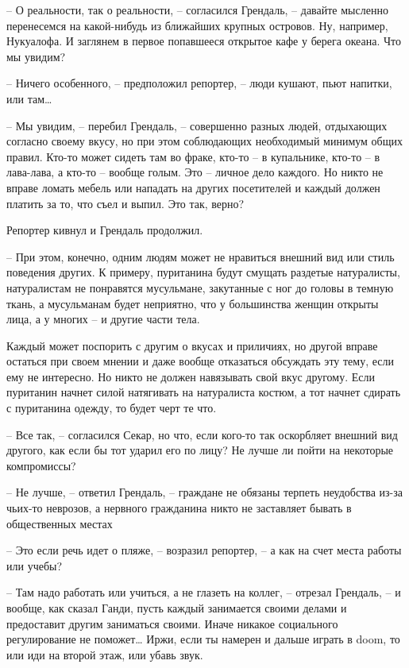 -- О реальности, так о реальности, -- согласился Грендаль, -- давайте мысленно перенесемся на какой-нибудь из ближайших крупных островов. Ну, например, Нукуалофа. И заглянем в первое попавшееся открытое кафе у берега океана. Что мы увидим?

-- Ничего особенного, -- предположил репортер, -- люди кушают, пьют напитки, или там\ldots{}

-- Мы увидим, -- перебил Грендаль, -- совершенно разных людей, отдыхающих согласно своему вкусу, но при этом соблюдающих необходимый минимум общих правил. Кто-то может сидеть там во фраке, кто-то -- в купальнике, кто-то -- в лава-лава, а кто-то -- вообще голым. Это -- личное дело каждого. Но никто не вправе ломать мебель или нападать на других посетителей и каждый должен платить за то, что съел и выпил. Это так, верно?

Репортер кивнул и Грендаль продолжил.

-- При этом, конечно, одним людям может не нравиться внешний вид или стиль поведения других. К примеру, пуританина будут смущать раздетые натуралисты, натуралистам не понравятся мусульмане, закутанные с ног до головы в темную ткань, а мусульманам будет неприятно, что у большинства женщин открыты лица, а у многих -- и другие части тела.

Каждый может поспорить с другим о вкусах и приличиях, но другой вправе остаться при своем мнении и даже вообще отказаться обсуждать эту тему, если ему не интересно. Но никто не должен навязывать свой вкус другому. Если пуританин начнет силой натягивать на натуралиста костюм, а тот начнет сдирать с пуританина одежду, то будет черт те что.

-- Все так, -- согласился Секар, но что, если кого-то так оскорбляет внешний вид другого, как если бы тот ударил его по лицу? Не лучше ли пойти на некоторые компромиссы?

-- Не лучше, -- ответил Грендаль, -- граждане не обязаны терпеть неудобства из-за чьих-то неврозов, а нервного гражданина никто не заставляет бывать в общественных местах

-- Это если речь идет о пляже, -- возразил репортер, -- а как на счет места работы или учебы?

-- Там надо работать или учиться, а не глазеть на коллег, -- отрезал Грендаль, -- и вообще, как сказал Ганди, пусть каждый занимается своими делами и предоставит другим заниматься своими. Иначе никакое социального регулирование не поможет\ldots{} Иржи, если ты намерен и дальше играть в doom, то или иди на второй этаж, или убавь звук.

